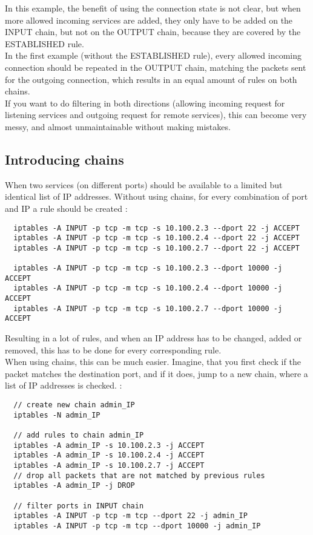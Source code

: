 \documentclass[a4paper,12pt]{article}
\begin{document}
In this example, the benefit of using the connection state is not clear, but when more allowed incoming services are added, they only have to be added on the INPUT chain, but not on the OUTPUT chain, because they are covered by the ESTABLISHED rule.\\
In the first example (without the ESTABLISHED rule), every allowed incoming connection should be repeated in the OUTPUT chain, matching the packets sent for the outgoing connection, which results in an equal amount of rules on both chains.\\
If you want to do filtering in both directions (allowing incoming request for listening services and outgoing request for remote services), this can become very messy, and almost unmaintainable without making mistakes.\\

\subsection{Introducing chains}
When two services (on different ports) should be available to a limited but identical list of IP addresses.
Without using chains, for every combination of port and IP a rule should be created :
\begin{verbatim}
  iptables -A INPUT -p tcp -m tcp -s 10.100.2.3 --dport 22 -j ACCEPT
  iptables -A INPUT -p tcp -m tcp -s 10.100.2.4 --dport 22 -j ACCEPT
  iptables -A INPUT -p tcp -m tcp -s 10.100.2.7 --dport 22 -j ACCEPT

  iptables -A INPUT -p tcp -m tcp -s 10.100.2.3 --dport 10000 -j ACCEPT
  iptables -A INPUT -p tcp -m tcp -s 10.100.2.4 --dport 10000 -j ACCEPT
  iptables -A INPUT -p tcp -m tcp -s 10.100.2.7 --dport 10000 -j ACCEPT
\end{verbatim}

Resulting in a lot of rules, and when an IP address has to be changed, added or removed, this has to be done for every corresponding rule.\\

When using chains, this can be much easier. Imagine, that you first check if the packet matches the destination port, and if it does, jump to a new chain, where a list of IP addresses is checked. :
\begin{verbatim}
  // create new chain admin_IP
  iptables -N admin_IP

  // add rules to chain admin_IP
  iptables -A admin_IP -s 10.100.2.3 -j ACCEPT
  iptables -A admin_IP -s 10.100.2.4 -j ACCEPT
  iptables -A admin_IP -s 10.100.2.7 -j ACCEPT
  // drop all packets that are not matched by previous rules
  iptables -A admin_IP -j DROP

  // filter ports in INPUT chain
  iptables -A INPUT -p tcp -m tcp --dport 22 -j admin_IP
  iptables -A INPUT -p tcp -m tcp --dport 10000 -j admin_IP
\end{verbatim}
\end{document}
